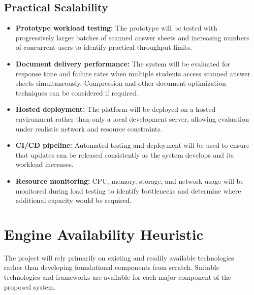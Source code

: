 \documentclass[11pt,a4paper]{article}
\begin{document}
\subsection{Practical Scalability}
\begin{itemize}[leftmargin=0.7cm]
    \item \textbf{Prototype workload testing:} The prototype will be tested with progressively larger batches of scanned answer sheets and increasing numbers of concurrent users to identify practical throughput limits.
    \item \textbf{Document delivery performance:} The system will be evaluated for response time and failure rates when multiple students access scanned answer sheets simultaneously. Compression and other document-optimization techniques can be considered if required.
    \item \textbf{Hosted deployment:} The platform will be deployed on a hosted environment rather than only a local development server, allowing evaluation under realistic network and resource constraints.
    \item \textbf{CI/CD pipeline:} Automated testing and deployment will be used to ensure that updates can be released consistently as the system develops and its workload increases.
    \item \textbf{Resource monitoring:} CPU, memory, storage, and network usage will be monitored during load testing to identify bottlenecks and determine where additional capacity would be required.
\end{itemize}

\section{Engine Availability Heuristic}
The project will rely primarily on existing and readily available technologies rather than developing foundational components from scratch. Suitable technologies and frameworks are available for each major component of the proposed system.
\end{document}

